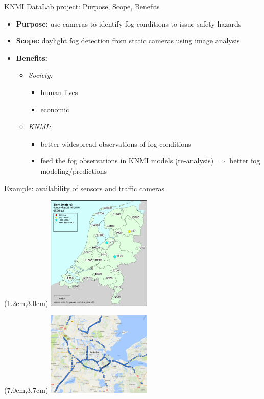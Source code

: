 \documentclass[10pt,fleqn]{beamer}\usepackage[]{graphicx}\usepackage[]{color}
\begin{document}
\begin{frame}{KNMI DataLab project: Purpose, Scope, Benefits}
\begin{itemize}
\item \textbf{Purpose:} use cameras to identify fog conditions to issue safety hazards
\item \textbf{Scope:} daylight fog detection from static cameras using image analysis
\item \textbf{Benefits:}
\begin{itemize}
\item \textit{Society: }
\begin{itemize}
\item human lives
\item economic
\end{itemize}
\item \textit{KNMI:}
\begin{itemize}
\item better widespread observations of fog conditions
\item feed the fog observations in KNMI models (re-analysis) $\Rightarrow$ better fog modeling/predictions
\end{itemize}
\end{itemize}

\end{itemize}
\end{frame}

\begin{frame}{Example: availability of sensors and traffic cameras}
 \begin{textblock*}{5cm}(1.2cm,3.0cm)
  \includegraphics[width=5cm]{SensorPlacement.png}
 \end{textblock*}
 \begin{textblock*}{5cm}(7.0cm,3.7cm)
  \includegraphics[width=5cm]{CameraPlacement.jpg}
 \end{textblock*}
\end{frame}
\end{document}
